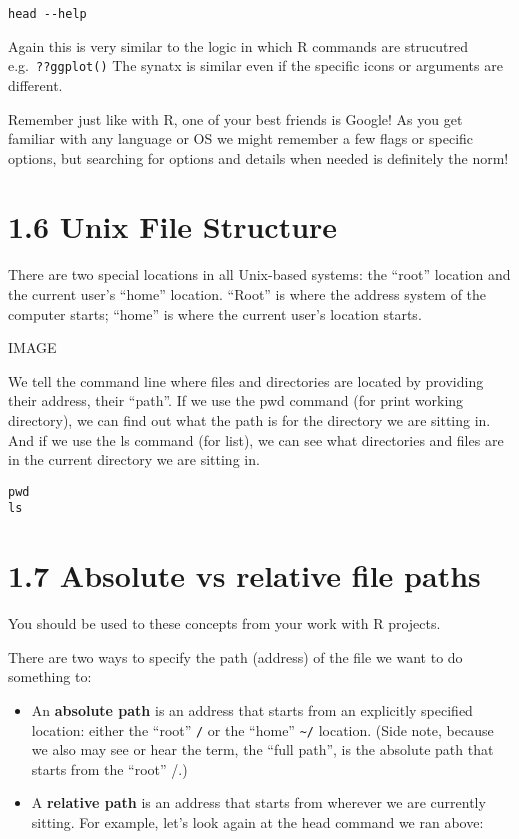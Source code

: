 \documentclass[
]{book}
\begin{document}
\begin{verbatim}
head --help
\end{verbatim}

Again this is very similar to the logic in which R commands are strucutred e.g.~\texttt{??ggplot()} The synatx is similar even if the specific icons or arguments are different.

Remember just like with R, one of your best friends is Google! As you get familiar with any language or OS we might remember a few flags or specific options, but searching for options and details when needed is definitely the norm!

\hypertarget{unix-file-structure}{%
\section{1.6 Unix File Structure}\label{unix-file-structure}}

There are two special locations in all Unix-based systems: the ``root'' location and the current user's ``home'' location. ``Root'' is where the address system of the computer starts; ``home'' is where the current user's location starts.

IMAGE

We tell the command line where files and directories are located by providing their address, their ``path''. If we use the pwd command (for print working directory), we can find out what the path is for the directory we are sitting in. And if we use the ls command (for list), we can see what directories and files are in the current directory we are sitting in.

\begin{verbatim}
pwd
ls
\end{verbatim}

\hypertarget{absolute-vs-relative-file-paths}{%
\section{1.7 Absolute vs relative file paths}\label{absolute-vs-relative-file-paths}}

You should be used to these concepts from your work with R projects.

There are two ways to specify the path (address) of the file we want to do something to:

\begin{itemize}
\item
  An \textbf{absolute path} is an address that starts from an explicitly specified location: either the ``root'' \texttt{/} or the ``home'' \texttt{\textasciitilde{}/} location. (Side note, because we also may see or hear the term, the ``full path'', is the absolute path that starts from the ``root'' /.)
\item
  A \textbf{relative path} is an address that starts from wherever we are currently sitting. For example, let's look again at the head command we ran above:
\end{itemize}
\end{document}
